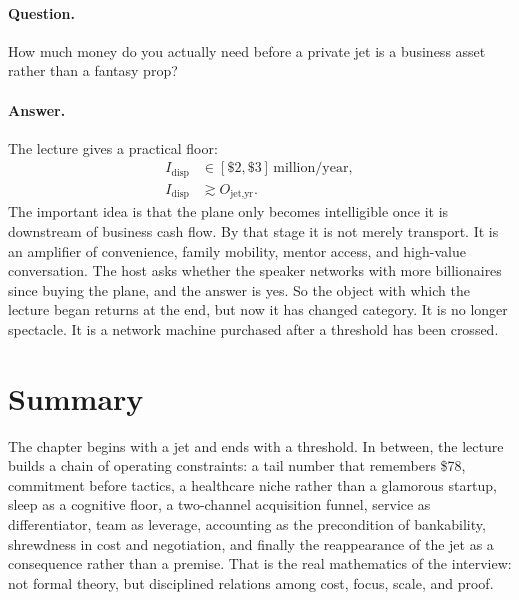 \paragraph{Question.} How much money do you actually need before a private jet is a business asset rather than a fantasy prop?

\paragraph{Answer.} The lecture gives a practical floor:
\begin{align}
I_{\text{disp}} &\in [\$2,\$3]\,\text{million/year}, \\
I_{\text{disp}} &\gtrsim O_{\text{jet,yr}}.
\end{align}
The important idea is that the plane only becomes intelligible once it is downstream of business cash flow. By that stage it is not merely transport. It is an amplifier of convenience, family mobility, mentor access, and high-value conversation. The host asks whether the speaker networks with more billionaires since buying the plane, and the answer is yes. So the object with which the lecture began returns at the end, but now it has changed category. It is no longer spectacle. It is a network machine purchased after a threshold has been crossed.

\section{Summary}

The chapter begins with a jet and ends with a threshold. In between, the lecture builds a chain of operating constraints: a tail number that remembers \$78, commitment before tactics, a healthcare niche rather than a glamorous startup, sleep as a cognitive floor, a two-channel acquisition funnel, service as differentiator, team as leverage, accounting as the precondition of bankability, shrewdness in cost and negotiation, and finally the reappearance of the jet as a consequence rather than a premise. That is the real mathematics of the interview: not formal theory, but disciplined relations among cost, focus, scale, and proof.